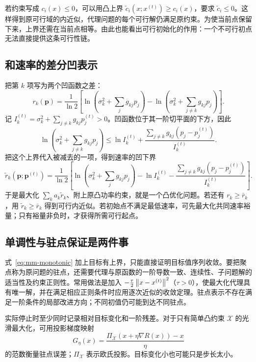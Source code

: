 若约束写成 $c_i(x)\leq0$，可以用凸上界 $\widetilde c_i(x;x^{(t)})\geq c_i(x)$，要求 $\widetilde c_i\leq0$。这样得到原可行域的内近似，代理问题的每个可行解仍满足原约束。为使当前点保留下来，上界还需在当前点相等。由此也能看出可行初始化的作用：一个不可行初点无法直接提供这条可行性链。

\subsection{和速率的差分凹表示}

把第 $k$ 项写为两个凹函数之差：
\begin{equation}
 r_k(\bm p)=\frac{1}{\ln2}\left[
 \ln\left(\sigma_k^2+\sum_jg_{kj}p_j\right)
 -\ln\left(\sigma_k^2+\sum_{j\ne k}g_{kj}p_j\right)\right].
 \label{eq:rate-dc}
\end{equation}
记 $I_k^{(t)}=\sigma_k^2+\sum_{j\ne k}g_{kj}p_j^{(t)}>0$。凹函数位于其一阶切平面的下方，因此
\begin{equation}
 \ln\left(\sigma_k^2+\sum_{j\ne k}g_{kj}p_j\right)
 \leq\ln I_k^{(t)}+
 \frac{\sum_{j\ne k}g_{kj}(p_j-p_j^{(t)})}{I_k^{(t)}}.
\end{equation}
把这个上界代入被减去的一项，得到速率的凹下界
\begin{equation}
 \widetilde r_k(\bm p;\bm p^{(t)})=
 \frac{1}{\ln2}\left[
 \ln\left(\sigma_k^2+\sum_jg_{kj}p_j\right)-\ln I_k^{(t)}
 -\frac{\sum_{j\ne k}g_{kj}(p_j-p_j^{(t)})}{I_k^{(t)}}\right].
 \label{eq:sca-rate}
\end{equation}
于是最大化 $\sum_k a_k\widetilde r_k$、附上原凸功率约束，就是一个凸优化问题。若还有 $r_k\geq\bar r_k$，用 $\widetilde r_k\geq\bar r_k$ 得到可行内近似。若初始点不满足最低速率，可先最大化共同速率裕量；只有裕量非负时，才获得所需可行起点。

\subsection{单调性与驻点保证是两件事}

式~\eqref{eq:mm-monotonic} 加上目标有上界，只能直接证明目标值序列收敛。要把聚点称为原问题的驻点，还需要代理与原函数的一阶导数一致、连续性、子问题解的适当性及约束正则性。常用做法是加入 $-\tfrac{\tau}{2}\left\lVert x-x^{(t)}\right\rVert^2$（$\tau>0$），使最大化代理具有唯一解，并在满足相应正则条件时应用逐次近似的收敛定理\cite{razaviyayn2013}。驻点表示不存在满足一阶条件的局部改进方向；不同初值仍可能到达不同驻点。

实际停止时至少同时记录相对目标变化和一阶残差。对于只有简单凸约束 $\mathcal X$ 的光滑最大化，可用投影梯度映射
\begin{equation}
 G_\eta(x)=\frac{\Pi_{\mathcal X}(x+\eta\nabla R(x))-x}{\eta}
\end{equation}
的范数衡量驻点误差；$\Pi_{\mathcal X}$ 表示欧氏投影。目标变化小也可能只是步长太小。

